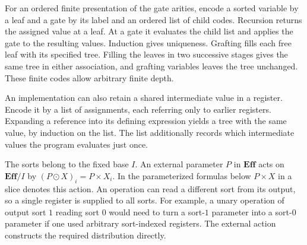 \documentclass[11pt,a4paper]{article}
\theoremstyle{definition}
\theoremstyle{remark}\newaliascnt{remark}{theorem}
\newcommand{\E}{\mathbf{Eff}}
\numberwithin{equation}{section}
\begin{document}
For an ordered finite presentation of the gate arities, encode a sorted variable by a leaf and a gate by its label and an ordered list of child codes. Recursion returns the assigned value at a leaf. At a gate it evaluates the child list and applies the gate to the resulting values. Induction gives uniqueness. Grafting fills each free leaf with its specified tree. Filling the leaves in two successive stages gives the same tree in either association, and grafting variables leaves the tree unchanged. These finite codes allow arbitrary finite depth.

An implementation can also retain a shared intermediate value in a register. Encode it by a list of assignments, each referring only to earlier registers. Expanding a reference into its defining expression yields a tree with the same value, by induction on the list. The list additionally records which intermediate values the program evaluates just once.

The sorts belong to the fixed base $I$. An external parameter $P$ in $\E$ acts on $\E/I$ by $(P\odot X)_i=P\times X_i$. In the parameterized formulas below $P\times X$ in a slice denotes this action. An operation can read a different sort from its output, so a single register is supplied to all sorts. For example, a unary operation of output sort $1$ reading sort $0$ would need to turn a sort-$1$ parameter into a sort-$0$ parameter if one used arbitrary sort-indexed registers. The external action constructs the required distribution directly.
\end{document}
